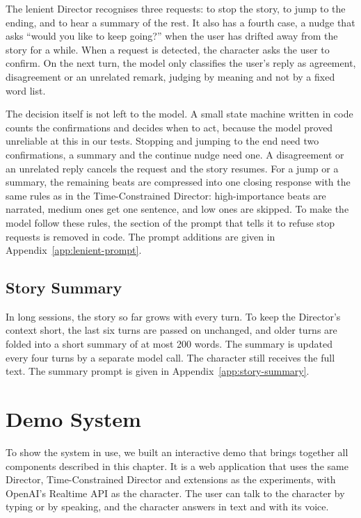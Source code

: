 The lenient Director recognises three requests: to stop the story, to jump to the ending, and to hear a summary of the rest. It also has a fourth case, a nudge that asks ``would you like to keep going?'' when the user has drifted away from the story for a while. When a request is detected, the character asks the user to confirm. On the next turn, the model only classifies the user's reply as agreement, disagreement or an unrelated remark, judging by meaning and not by a fixed word list.

The decision itself is not left to the model. A small state machine written in code counts the confirmations and decides when to act, because the model proved unreliable at this in our tests. Stopping and jumping to the end need two confirmations, a summary and the continue nudge need one. A disagreement or an unrelated reply cancels the request and the story resumes. For a jump or a summary, the remaining beats are compressed into one closing response with the same rules as in the Time-Constrained Director: high-importance beats are narrated, medium ones get one sentence, and low ones are skipped. To make the model follow these rules, the section of the prompt that tells it to refuse stop requests is removed in code. The prompt additions are given in Appendix~\ref{app:lenient-prompt}.

\subsection{Story Summary}

In long sessions, the story so far grows with every turn. To keep the Director's context short, the last six turns are passed on unchanged, and older turns are folded into a short summary of at most 200 words. The summary is updated every four turns by a separate model call. The character still receives the full text. The summary prompt is given in Appendix~\ref{app:story-summary}.

\section{Demo System}\label{sec:demo}

To show the system in use, we built an interactive demo that brings together all components described in this chapter. It is a web application that uses the same Director, Time-Constrained Director and extensions as the experiments, with OpenAI's Realtime API as the character. The user can talk to the character by typing or by speaking, and the character answers in text and with its voice.

